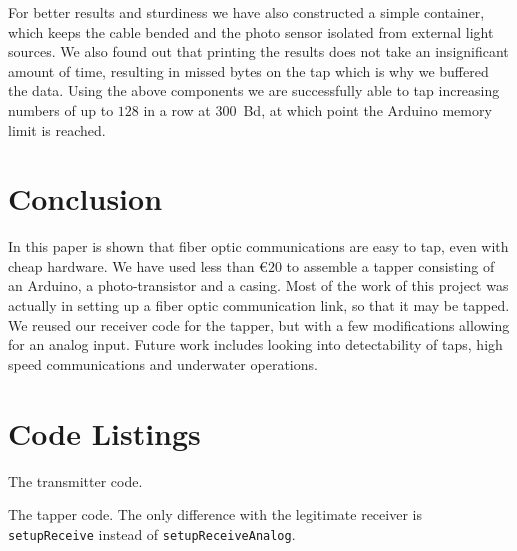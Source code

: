 \documentclass[11pt,twoside,a4paper]{scrartcl}
\begin{document}
		For better results and sturdiness we have also constructed a simple container,
		which keeps the cable bended and the photo sensor isolated from external light sources.
		We also found out that printing the results does not take an insignificant amount of time,
		resulting in missed bytes on the tap which is why we buffered the data.
		Using the above components we are successfully able to tap increasing numbers of up to
		$128$ in a row at \SI{300}{Bd}, at which point the Arduino memory limit is reached.

\section{Conclusion}
	In this paper is shown that fiber optic communications are easy to tap, even with cheap hardware.
	We have used less than \euro{}$20$ to assemble a tapper consisting of an Arduino,
	a photo-transistor and a casing.
	Most of the work of this project was actually in setting up a fiber optic communication link,
	so that it may be tapped.
	We reused our receiver code for the tapper, but with a few modifications allowing for an analog input.
	Future work includes looking into detectability of taps, high speed communications
	and underwater operations.




\appendix
	\section{Code Listings}
		\begin{listing}
			\caption{The transmitter code.}
			\label{lst:transmitterCode}
		\end{listing}

		\begin{listing}
			\cfile{../receiver/receiver.ino}
			\caption{The tapper code.
				The only difference with the legitimate receiver is \texttt{setupReceive} instead of \texttt{setupReceiveAnalog}.}
			\label{lst:receiverCode}
		\end{listing}
\end{document}
